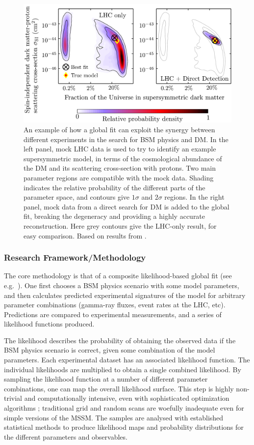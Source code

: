 \documentclass[10pt,oneside,twocolumn,a4paper]{article}
\begin{document}
\begin{figure}
  \centering
  \includegraphics[width=1.35\linewidth]{Fig}
  \caption{An example of how a global fit can exploit the synergy between different experiments in the search for BSM physics and DM.  In the left panel, mock LHC data is used to try to identify an example supersymmetric model, in terms of the cosmological abundance of the DM and its scattering cross-section with protons.  Two main parameter regions are compatible with the mock data.  Shading indicates the relative probability of the different parts of the parameter space, and contours give $1\sigma$ and $2\sigma$ regions.  In the right panel, mock data from a direct search for DM is added to the global fit, breaking the degeneracy and providing a highly accurate reconstruction.  Here grey contours give the LHC-only result, for easy comparison.  Based on results from \cite{BertoneLHCDD}.}
  \label{example}
\end{figure}

\subsubsection*{Research Framework/Methodology}

The core methodology is that of a composite likelihood-based global fit (see e.g.~\cite{Trotta08,Akrami09,Scott09c}).  One first chooses a BSM physics scenario with some model parameters, and then calculates predicted experimental signatures of the model for arbitrary parameter combinations (gamma-ray fluxes, event rates at the LHC, etc).  Predictions are compared to experimental measurements, and a series of likelihood functions produced.

The likelihood describes the probability of obtaining the observed data if the BSM physics scenario is correct, given some combination of the model parameters.  Each experimental dataset has an associated likelihood function.  The individual likelihoods are multiplied to obtain a single combined likelihood.  By sampling the likelihood function at a number of different parameter combinations, one can map the overall likelihood surface.  This step is highly non-trivial and computationally intensive, even with sophisticated optimization algorithms \cite{Akrami09,SBspike}; traditional grid and random scans are woefully inadequate even for simple versions of the MSSM.  The samples are analysed with established statistical methods to produce likelihood maps and probability distributions for the different parameters and observables.  
\end{document}
